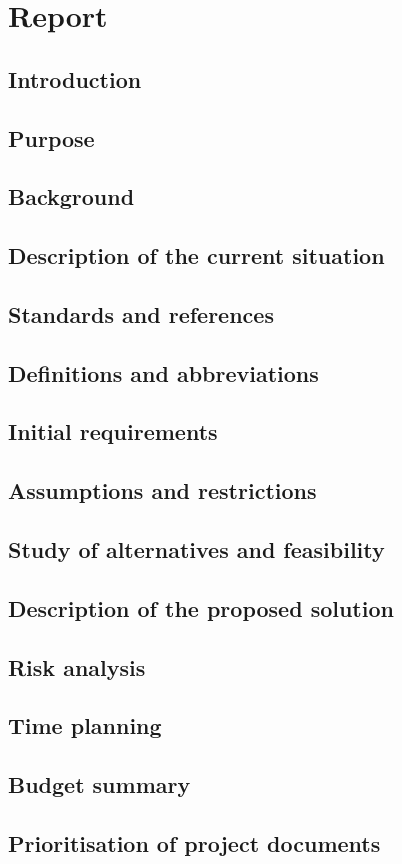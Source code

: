 \renewcommand{\documentname}{Report}

\chapter{Report}

\section{Introduction}
\section{Purpose}
\section{Background}
\section{Description of the current situation}
\section{Standards and references}
\section{Definitions and abbreviations}
\section{Initial requirements}
\section{Assumptions and restrictions}
\section{Study of alternatives and feasibility}
\section{Description of the proposed solution}
\section{Risk analysis}
\section{Time planning}
\section{Budget summary}
\section{Prioritisation of project documents}

